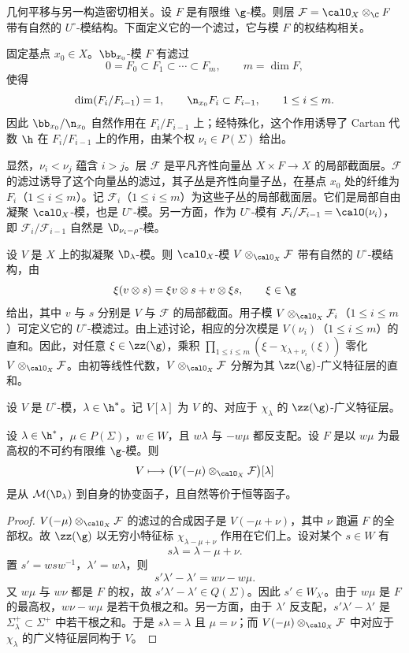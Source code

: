 几何平移与另一构造密切相关。设 $F$ 是有限维 $\g$-模。则层 $\mathcal{F}=\calO_X\otimes_\C F$ 带有自然的 $U^\circ$-模结构。下面定义它的一个滤过，它与模 $F$ 的权结构相关。

固定基点 $x_0\in X$。$\bb_{x_0}$-模 $F$ 有滤过
$$0=F_0\subset F_1\subset\cdots\subset F_m,\qquad m=\dim F,$$
使得
$$\dim(F_i/F_{i-1})=1,\qquad \n_{x_0}F_i\subset F_{i-1},\qquad 1\le i\le m.$$
因此 $\bb_{x_0}/\n_{x_0}$ 自然作用在 $F_i/F_{i-1}$ 上；经特殊化，这个作用诱导了 Cartan 代数 $\h$ 在 $F_i/F_{i-1}$ 上的作用，由某个权 $\nu_i\in P(\Sigma)$ 给出。

显然，$\nu_i<\nu_j$ 蕴含 $i>j$。层 $\mathcal{F}$ 是平凡齐性向量丛 $X\times F\to X$ 的局部截面层。$\mathcal{F}$ 的滤过诱导了这个向量丛的滤过，其子丛是齐性向量子丛，在基点 $x_0$ 处的纤维为 $F_i$（$1\le i\le m$）。记 $\mathcal{F}_i$（$1\le i\le m$）为这些子丛的局部截面层。它们是局部自由凝聚 $\calO_X$-模，也是 $U^\circ$-模。另一方面，作为 $U^\circ$-模有 $\mathcal{F}_i/\mathcal{F}_{i-1}=\calO(\nu_i)$，即 $\mathcal{F}_i/\mathcal{F}_{i-1}$ 自然是 $\D_{\nu_i-\rho}$-模。

设 $V$ 是 $X$ 上的拟凝聚 $\D_\lambda$-模。则 $\calO_X$-模 $V\otimes_{\calO_X}\mathcal{F}$ 带有自然的 $U^\circ$-模结构，由
$$\xi(v\otimes s)=\xi v\otimes s+v\otimes\xi s,\qquad \xi\in\g$$
给出，其中 $v$ 与 $s$ 分别是 $V$ 与 $\mathcal{F}$ 的局部截面。用子模 $V\otimes_{\calO_X}\mathcal{F}_i$（$1\le i\le m$）可定义它的 $U^\circ$-模滤过。由上述讨论，相应的分次模是 $V(\nu_i)$（$1\le i\le m$）的直和。因此，对任意 $\xi\in\zz(\g)$，乘积 $\prod_{1\le i\le m}(\xi-\chi_{\lambda+\nu_i}(\xi))$ 零化 $V\otimes_{\calO_X}\mathcal{F}$。由初等线性代数，$V\otimes_{\calO_X}\mathcal{F}$ 分解为其 $\zz(\g)$-广义特征层的直和。

设 $V$ 是 $U^\circ$-模，$\lambda\in\h^*$。记 $V[\lambda]$ 为 $V$ 的、对应于 $\chi_\lambda$ 的 $\zz(\g)$-广义特征层。

\begin{lemma}\label{lem:02.2.2.1}
设 $\lambda\in\h^*$，$\mu\in P(\Sigma)$，$w\in W$，且 $w\lambda$ 与 $-w\mu$ 都反支配。设 $F$ 是以 $w\mu$ 为最高权的不可约有限维 $\g$-模。则
$$V\longmapsto\bigl(V(-\mu)\otimes_{\calO_X}\mathcal{F}\bigr)[\lambda]$$
是从 $\mathcal{M}(\D_\lambda)$ 到自身的协变函子，且自然等价于恒等函子。
\end{lemma}

\begin{proof}
$V(-\mu)\otimes_{\calO_X}\mathcal{F}$ 的滤过的合成因子是 $V(-\mu+\nu)$，其中 $\nu$ 跑遍 $F$ 的全部权。故 $\zz(\g)$ 以无穷小特征标 $\chi_{\lambda-\mu+\nu}$ 作用在它们上。设对某个 $s\in W$ 有
$$s\lambda=\lambda-\mu+\nu.$$
置 $s'=wsw^{-1}$，$\lambda'=w\lambda$，则
$$s'\lambda'-\lambda'=w\nu-w\mu.$$
又 $w\mu$ 与 $w\nu$ 都是 $F$ 的权，故 $s'\lambda'-\lambda'\in Q(\Sigma)$。因此 $s'\in W_{\lambda'}$。由于 $w\mu$ 是 $F$ 的最高权，$w\nu-w\mu$ 是若干负根之和。另一方面，由于 $\lambda'$ 反支配，$s'\lambda'-\lambda'$ 是 $\Sigma_\lambda^+\subset\Sigma^+$ 中若干根之和。于是 $s\lambda=\lambda$ 且 $\mu=\nu$；而 $V(-\mu)\otimes_{\calO_X}\mathcal{F}$ 中对应于 $\chi_\lambda$ 的广义特征层同构于 $V$。
\end{proof}

